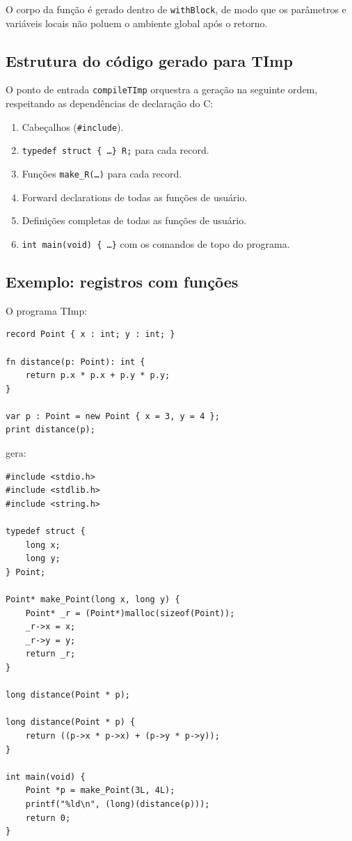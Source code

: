 O corpo da função é gerado dentro de \texttt{withBlock}, de modo que os
parâmetros e variáveis locais não poluem o ambiente global após o retorno.

\subsection{Estrutura do código gerado para TImp}

O ponto de entrada \texttt{compileTImp} orquestra a geração na seguinte
ordem, respeitando as dependências de declaração do C:

\begin{enumerate}
  \item Cabeçalhos (\texttt{\#include}).
  \item \texttt{typedef struct \{ \ldots \} R;} para cada record.
  \item Funções \texttt{make\_R(\ldots)} para cada record.
  \item Forward declarations de todas as funções de usuário.
  \item Definições completas de todas as funções de usuário.
  \item \texttt{int main(void) \{ \ldots \}} com os comandos de topo do programa.
\end{enumerate}

\subsection{Exemplo: registros com funções}

O programa TImp:
\begin{verbatim}
record Point { x : int; y : int; }

fn distance(p: Point): int {
    return p.x * p.x + p.y * p.y;
}

var p : Point = new Point { x = 3, y = 4 };
print distance(p);
\end{verbatim}

gera:

\begin{verbatim}
#include <stdio.h>
#include <stdlib.h>
#include <string.h>

typedef struct {
    long x;
    long y;
} Point;

Point* make_Point(long x, long y) {
    Point* _r = (Point*)malloc(sizeof(Point));
    _r->x = x;
    _r->y = y;
    return _r;
}

long distance(Point * p);

long distance(Point * p) {
    return ((p->x * p->x) + (p->y * p->y));
}

int main(void) {
    Point *p = make_Point(3L, 4L);
    printf("%ld\n", (long)(distance(p)));
    return 0;
}
\end{verbatim}

